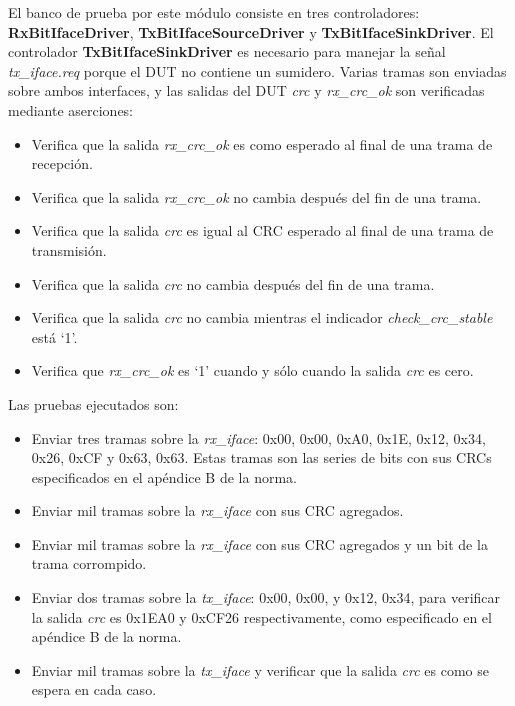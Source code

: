 \documentclass[a4paper, twoside, 11pt]{report}
\begin{document}
El banco de prueba por este módulo consiste en tres controladores: \textbf{RxBitIfaceDriver}, \textbf{TxBitIfaceSourceDriver} y \textbf{TxBitIfaceSinkDriver}. El controlador  \textbf{TxBitIfaceSinkDriver} es necesario para manejar la señal \textit{tx\_iface.req} porque el DUT no contiene un sumidero. Varias tramas son enviadas sobre ambos interfaces, y las salidas del DUT \textit{crc} y \textit{rx\_crc\_ok} son verificadas mediante aserciones:

\begin{itemize}
  \item Verifica que la salida \textit{rx\_crc\_ok} es como esperado al final de una trama de recepción.
  \item Verifica que la salida \textit{rx\_crc\_ok} no cambia después del fin de una trama.
  \item Verifica que la salida \textit{crc} es igual al CRC esperado al final de una trama de transmisión.
  \item Verifica que la salida \textit{crc} no cambia después del fin de una trama.
  \item Verifica que la salida \textit{crc} no cambia mientras el indicador \textit{check\_crc\_stable} está ‘1’.
  \item Verifica que \textit{rx\_crc\_ok} es ‘1’ cuando y sólo cuando la salida \textit{crc} es cero.
\end{itemize}

Las pruebas ejecutados son:

\begin{itemize}
  \item Enviar tres tramas sobre la \textit{rx\_iface}: {0x00, 0x00, 0xA0, 0x1E}, {0x12, 0x34, 0x26, 0xCF} y {0x63, 0x63}. Estas tramas son las series de bits con sus CRCs especificados en el apéndice B de la norma.
  \item Enviar mil tramas sobre la \textit{rx\_iface} con sus CRC agregados.
  \item Enviar mil tramas sobre la \textit{rx\_iface} con sus CRC agregados y un bit de la trama corrompido.
  \item Enviar dos tramas sobre la \textit{tx\_iface}: {0x00, 0x00}, y {0x12, 0x34}, para verificar la salida \textit{crc} es 0x1EA0 y 0xCF26 respectivamente, como especificado en el apéndice B de la norma.
  \item Enviar mil tramas sobre la \textit{tx\_iface} y verificar que la salida \textit{crc} es como se espera en cada caso.
\end{itemize}
\end{document}

